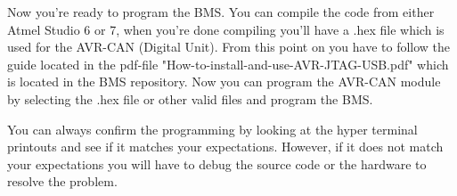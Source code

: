 Now you're ready to program the BMS. You can compile the code from either Atmel Studio 6 or 7, when you're done compiling you'll have a .hex file which is used for the AVR-CAN (Digital Unit). From this point on you have to follow the guide located in the pdf-file "How-to-install-and-use-AVR-JTAG-USB.pdf" which is located in the BMS repository. Now you can program the AVR-CAN module by selecting the .hex file or other valid files and program the BMS.

You can always confirm the programming by looking at the hyper terminal printouts and see if it matches your expectations. However, if it does not match your expectations you will have to debug the source code or the hardware to resolve the problem.

